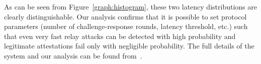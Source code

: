 As can be seen from Figure~\ref{graph:histogram}, these two latency distributions are clearly distinguishable. Our analysis confirms that it is possible to set protocol parameters (number of challenge-response rounds, latency threshold, etc.) such that even very fast relay attacks can be detected with high probability and legitimate attestations fail only with negligible probability. The full details of the \proximitee system and our analysis can be found from~\cite{proximitee}.





